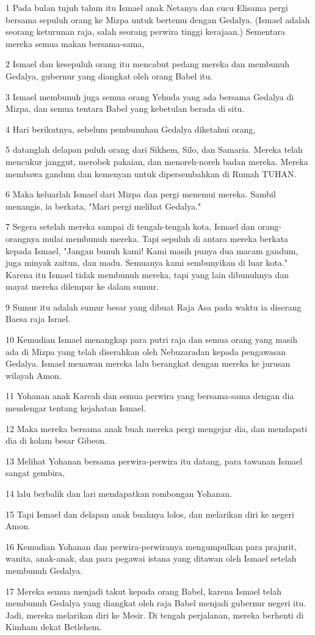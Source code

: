 \par 1 Pada bulan tujuh tahun itu Ismael anak Netanya dan cucu Elisama pergi bersama sepuluh orang ke Mizpa untuk bertemu dengan Gedalya. (Ismael adalah seorang keturunan raja, salah seorang perwira tinggi kerajaan.) Sementara mereka semua makan bersama-sama,
\par 2 Ismael dan kesepuluh orang itu mencabut pedang mereka dan membunuh Gedalya, gubernur yang diangkat oleh orang Babel itu.
\par 3 Ismael membunuh juga semua orang Yehuda yang ada bersama Gedalya di Mizpa, dan semua tentara Babel yang kebetulan berada di situ.
\par 4 Hari berikutnya, sebelum pembunuhan Gedalya diketahui orang,
\par 5 datanglah delapan puluh orang dari Sikhem, Silo, dan Samaria. Mereka telah mencukur janggut, merobek pakaian, dan menoreh-noreh badan mereka. Mereka membawa gandum dan kemenyan untuk dipersembahkan di Rumah TUHAN.
\par 6 Maka keluarlah Ismael dari Mizpa dan pergi menemui mereka. Sambil menangis, ia berkata, "Mari pergi melihat Gedalya."
\par 7 Segera setelah mereka sampai di tengah-tengah kota, Ismael dan orang-orangnya mulai membunuh mereka. Tapi sepuluh di antara mereka berkata kepada Ismael, "Jangan bunuh kami! Kami masih punya dua macam gandum, juga minyak zaitun, dan madu. Semuanya kami sembunyikan di luar kota." Karena itu Ismael tidak membunuh mereka, tapi yang lain dibunuhnya dan mayat mereka dilempar ke dalam sumur.
\par 9 Sumur itu adalah sumur besar yang dibuat Raja Asa pada waktu ia diserang Baesa raja Israel.
\par 10 Kemudian Ismael menangkap para putri raja dan semua orang yang masih ada di Mizpa yang telah diserahkan oleh Nebuzaradan kepada pengawasan Gedalya. Ismael menawan mereka lalu berangkat dengan mereka ke jurusan wilayah Amon.
\par 11 Yohanan anak Kareah dan semua perwira yang bersama-sama dengan dia mendengar tentang kejahatan Ismael.
\par 12 Maka mereka bersama anak buah mereka pergi mengejar dia, dan mendapati dia di kolam besar Gibeon.
\par 13 Melihat Yohanan bersama perwira-perwira itu datang, para tawanan Ismael sangat gembira,
\par 14 lalu berbalik dan lari mendapatkan rombongan Yohanan.
\par 15 Tapi Ismael dan delapan anak buahnya lolos, dan melarikan diri ke negeri Amon.
\par 16 Kemudian Yohanan dan perwira-perwiranya mengumpulkan para prajurit, wanita, anak-anak, dan para pegawai istana yang ditawan oleh Ismael setelah membunuh Gedalya.
\par 17 Mereka semua menjadi takut kepada orang Babel, karena Ismael telah membunuh Gedalya yang diangkat oleh raja Babel menjadi gubernur negeri itu. Jadi, mereka melarikan diri ke Mesir. Di tengah perjalanan, mereka berhenti di Kimham dekat Betlehem.


